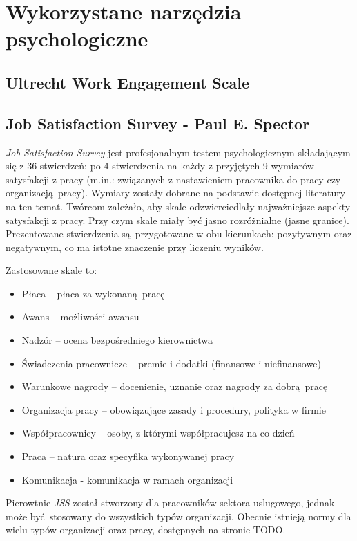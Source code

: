 \section{Wykorzystane narzędzia psychologiczne}
\subsection{Ultrecht Work Engagement Scale}
\subsection{Job Satisfaction Survey - Paul E. Spector}
\emph{Job Satisfaction Survey} jest profesjonalnym testem psychologicznym składającym się z 36 stwierdzeń: po 4 stwierdzenia na każdy z przyjętych 9 wymiarów satysfakcji z pracy (m.in.: związanych z nastawieniem pracownika do pracy czy organizacją pracy). Wymiary zostały dobrane na podstawie dostępnej literatury na ten temat. Twórcom zależało, aby skale odzwierciedlały najważniejsze aspekty satysfakcji z pracy. Przy czym skale miały być jasno
rozróżnialne (jasne granice). Prezentowane stwierdzenia są przygotowane w obu kierunkach: pozytywnym oraz negatywnym, co ma istotne znaczenie przy liczeniu wyników. 

Zastosowane skale to:
\begin{itemize}
\item Płaca -- płaca za wykonaną pracę
\item Awans -- możliwości awansu
\item Nadzór -- ocena bezpośredniego kierownictwa
\item Świadczenia pracownicze -- premie i dodatki (finansowe i niefinansowe)
\item Warunkowe nagrody -- docenienie, uznanie oraz nagrody za dobrą pracę
\item Organizacja pracy -- obowiązujące zasady i procedury, polityka w firmie
\item Współpracownicy -- osoby, z którymi współpracujesz na co dzień
\item Praca -- natura oraz specyfika wykonywanej pracy
\item Komunikacja - komunikacja w ramach organizacji
\end{itemize}

Pierowtnie \emph{JSS} został stworzony dla pracowników sektora uslugowego, jednak może być stosowany do wszystkich typów organizacji. Obecnie istnieją normy dla wielu typów organizacji oraz pracy, dostępnych na stronie TODO.

